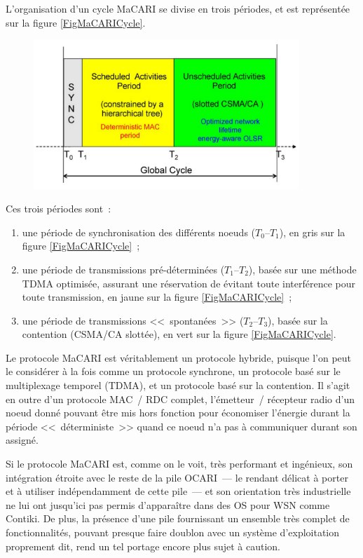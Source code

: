 L'organisation d'un cycle MaCARI se divise en trois périodes, et est
représentée sur la figure \vref{FigMaCARICycle}.

\begin{figure}[!htb]
\centering
\includegraphics[width=10cm]{images/ch3-ocari-macari-cycle.png}
\label{FigMaCARICycle}
\end{figure}

Ces trois périodes sont~:
\begin{enumerate}
\item une période de synchronisation des différents noeuds ($T_0$--$T_1$),
en gris sur la figure \vref{FigMaCARICycle}~;
\item une période de transmissions pré-déterminées ($T_1$--$T_2$), basée
sur une méthode TDMA optimisée, assurant une réservation de 
évitant toute interférence pour toute transmission, en jaune sur la
figure \vref{FigMaCARICycle}~;
\item une période de transmissions <<~spontanées~>> ($T_2$--$T_3$), basée
sur la contention (CSMA/CA slottée), en vert sur la figure
\vref{FigMaCARICycle}.
\end{enumerate}

Le protocole MaCARI est véritablement un protocole hybride, puisque l'on
peut le considérer à la fois comme un protocole synchrone, un protocole basé
sur le multiplexage temporel (TDMA), et un protocole basé sur la contention.
Il s'agit en outre d'un protocole MAC~/ RDC complet, l'émetteur~/ récepteur
radio d'un noeud donné pouvant être mis hors fonction pour économiser
l'énergie durant la période <<~déterministe~>> quand ce noeud n'a pas
à communiquer durant son  assigné.

Si le protocole MaCARI est, comme on le voit, très performant et ingénieux,
son intégration étroite avec le reste de la pile OCARI~--- le rendant
délicat à porter et à utiliser indépendamment de cette pile~--- et son
orientation très industrielle ne lui ont jusqu'ici pas permis d'apparaître
dans des OS pour WSN comme Contiki. De plus, la présence d'une pile
fournissant un ensemble très complet de fonctionnalités, pouvant presque
faire doublon avec un système d'exploitation proprement dit,
rend un tel portage encore plus sujet à caution.

